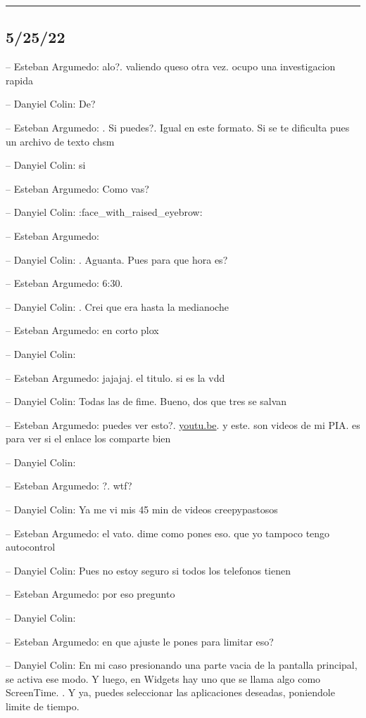 \begin{center}\rule{0.5\linewidth}{0.5pt}\end{center}

\hypertarget{section-85}{%
\subsection{5/25/22}\label{section-85}}

-- Esteban Argumedo: alo?. valiendo queso otra vez. ocupo una
investigacion rapida

-- Danyiel Colin: De?

-- Esteban Argumedo: . Si puedes?. Igual en este formato. Si se te
dificulta pues un archivo de texto chsm

-- Danyiel Colin: si

-- Esteban Argumedo: Como vas?

-- Danyiel Colin: :face\_with\_raised\_eyebrow:

-- Esteban Argumedo:

-- Danyiel Colin: . Aguanta. Pues para que hora es?

-- Esteban Argumedo: 6:30.

-- Danyiel Colin: . Crei que era hasta la medianoche

-- Esteban Argumedo: en corto plox

-- Danyiel Colin:

-- Esteban Argumedo: jajajaj. el titulo. si es la vdd

-- Danyiel Colin: Todas las de fime. Bueno, dos que tres se salvan

-- Esteban Argumedo: puedes ver esto?.
\href{https://youtu.be/532IWpnOkXY}{youtu.be}. y este. son videos de mi
PIA. es para ver si el enlace los comparte bien

-- Danyiel Colin:

-- Esteban Argumedo: ?. wtf?

-- Danyiel Colin: Ya me vi mis 45 min de videos creepypastosos

-- Esteban Argumedo: el vato. dime como pones eso. que yo tampoco tengo
autocontrol

-- Danyiel Colin: Pues no estoy seguro si todos los telefonos tienen

-- Esteban Argumedo: por eso pregunto

-- Danyiel Colin:

-- Esteban Argumedo: en que ajuste le pones para limitar eso?

-- Danyiel Colin: En mi caso presionando una parte vacia de la pantalla
principal, se activa ese modo. Y luego, en Widgets hay uno que se llama
algo como ScreenTime. . Y ya, puedes seleccionar las aplicaciones
deseadas, poniendole limite de tiempo.

